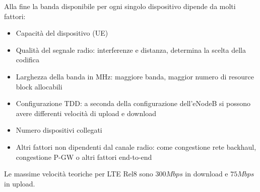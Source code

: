 Alla fine la banda disponibile per ogni singolo dispositivo dipende da molti fattori: 
\begin{itemize}
	\item Capacità del dispositivo (UE)
	\item Qualità del segnale radio: interferenze e distanza, determina la scelta della codifica
	\item Larghezza della banda in MHz: maggiore banda, maggior numero di resource block allocabili
	\item Configurazione TDD: a seconda della configurazione dell'eNodeB si possono avere differenti velocità di upload e download
	\item Numero dispositivi collegati
	\item Altri fattori non dipendenti dal canale radio: come congestione rete backhaul, congestione P-GW o altri fattori end-to-end
\end{itemize}

Le massime velocità teoriche per LTE Rel8 sono $300Mbps$ in download e $75Mbps$ in upload.\\

